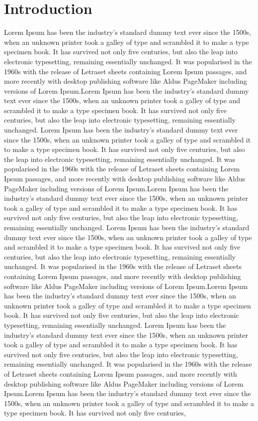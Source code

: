 \documentclass[10pt,conference]{IEEEtran}
\begin{document}
\section{Introduction}

Lorem Ipsum has been the industry's standard dummy text ever since the 1500s, when an unknown printer took a galley of type and scrambled it to make a type specimen book. It has survived not only five centuries, but also the leap into electronic typesetting, remaining essentially unchanged. It was popularised in the 1960s with the release of Letraset sheets containing Lorem Ipsum passages, and more recently with desktop publishing software like Aldus PageMaker including versions of Lorem Ipsum.Lorem Ipsum has been the industry's standard dummy text ever since the 1500s, when an unknown printer took a galley of type and scrambled it to make a type specimen book. It has survived not only five centuries, but also the leap into electronic typesetting, remaining essentially unchanged. Lorem Ipsum has been the industry's standard dummy text ever since the 1500s, when an unknown printer took a galley of type and scrambled it to make a type specimen book. It has survived not only five centuries, but also the leap into electronic typesetting, remaining essentially unchanged. It was popularised in the 1960s with the release of Letraset sheets containing Lorem Ipsum passages, and more recently with desktop publishing software like Aldus PageMaker including versions of Lorem Ipsum.Lorem Ipsum has been the industry's standard dummy text ever since the 1500s, when an unknown printer took a galley of type and scrambled it to make a type specimen book. It has survived not only five centuries, but also the leap into electronic typesetting, remaining essentially unchanged. Lorem Ipsum has been the industry's standard dummy text ever since the 1500s, when an unknown printer took a galley of type and scrambled it to make a type specimen book. It has survived not only five centuries, but also the leap into electronic typesetting, remaining essentially unchanged. It was popularised in the 1960s with the release of Letraset sheets containing Lorem Ipsum passages, and more recently with desktop publishing software like Aldus PageMaker including versions of Lorem Ipsum.Lorem Ipsum has been the industry's standard dummy text ever since the 1500s, when an unknown printer took a galley of type and scrambled it to make a type specimen book. It has survived not only five centuries, but also the leap into electronic typesetting, remaining essentially unchanged. Lorem Ipsum has been the industry's standard dummy text ever since the 1500s, when an unknown printer took a galley of type and scrambled it to make a type specimen book. It has survived not only five centuries, but also the leap into electronic typesetting, remaining essentially unchanged. It was popularised in the 1960s with the release of Letraset sheets containing Lorem Ipsum passages, and more recently with desktop publishing software like Aldus PageMaker including versions of Lorem Ipsum.Lorem Ipsum has been the industry's standard dummy text ever since the 1500s, when an unknown printer took a galley of type and scrambled it to make a type specimen book. It has survived not only five centuries, 
\end{document}
